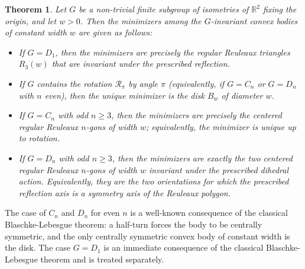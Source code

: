 \documentclass[11pt,letterpaper,reqno]{amsart}
\newcommand{\R}{\mathbb{R}}
\newtheorem{theorem}{Theorem}[section]
\providecommand{\R}{\mathbb{R}}
\begin{document}
\begin{theorem}\label{thm:main}
Let \( G \) be a non-trivial finite subgroup of isometries of \( \R^2 \) fixing the origin, and let \( w > 0 \). Then the minimizers among the \( G \)-invariant convex bodies of constant width \( w \) are given as follows:
\begin{itemize}
    \item If \( G = D_1 \), then the minimizers are precisely the regular Reuleaux triangles $R_3(w)$ that are invariant under the prescribed reflection.
    \item If \( G \) contains the rotation \( \mathcal R_\pi \) by angle \( \pi \) (equivalently, if \( G = C_n \) or \( G = D_n \) with \( n \) even), then the unique minimizer is the disk \( B_w \) of diameter \( w \).
    \item If \( G = C_n \) with odd \( n\ge 3 \), then the minimizers are precisely the centered regular Reuleaux \( n \)-gons of width \( w \); equivalently, the minimizer is unique up to rotation.
    \item If \(G=D_n\) with odd \(n\ge3\), then the minimizers are exactly the two centered regular Reuleaux \(n\)-gons of width \(w\) invariant under the prescribed dihedral action. Equivalently, they are the two orientations for which the prescribed reflection axis is a symmetry axis of the Reuleaux polygon.
\end{itemize}
\end{theorem}

The case of $C_n$ and $D_n$ for even $n$ is a well-known consequence of the classical Blaschke-Lebesgue theorem: a half-turn forces the body to be centrally symmetric, and the only centrally symmetric convex body of constant width is the disk.
The case \(G=D_1\) is an immediate consequence of the classical Blaschke-Lebesgue theorem and is treated separately. 
\end{document}
